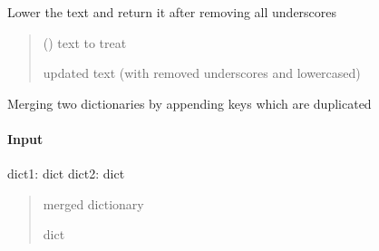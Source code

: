 \documentclass[letterpaper,10pt,english]{sphinxmanual}
\begin{document}
\begin{fulllineitems}
\label{\detokenize{api/pymusepipe:pymusepipe.util_pipe.lower_rep}}
\pysigstartsignatures
{}
\pysigstopsignatures
\sphinxAtStartPar
Lower the text and return it after removing all underscores
\begin{quote}\begin{description}
\sphinxAtStartPar
{} () \textendash{} text to treat

\sphinxAtStartPar
updated text (with removed underscores and lower\sphinxhyphen{}cased)

\end{description}\end{quote}

\end{fulllineitems}


\begin{fulllineitems}
\label{\detokenize{api/pymusepipe:pymusepipe.util_pipe.merge_dict}}
\pysigstartsignatures
{}
\pysigstopsignatures
\sphinxAtStartPar
Merging two dictionaries by appending
keys which are duplicated


\paragraph{Input}
\label{\detokenize{api/pymusepipe:id172}}
\sphinxAtStartPar
dict1: dict
dict2: dict
\begin{quote}\begin{description}
\sphinxAtStartPar
{} \textendash{} merged dictionary

\sphinxAtStartPar
dict

\end{description}\end{quote}

\end{fulllineitems}
\end{document}
